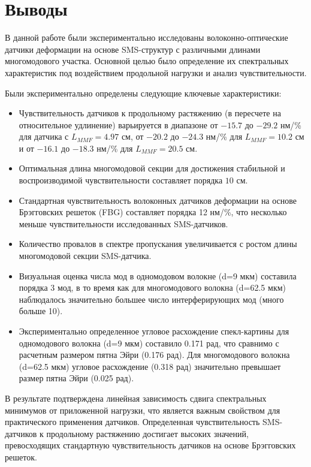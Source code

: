 \section{Выводы}

В данной работе были экспериментально исследованы волоконно-оптические датчики деформации на основе SMS-структур с различными длинами многомодового участка. Основной целью было определение их спектральных характеристик под воздействием продольной нагрузки и анализ чувствительности.

Были экспериментально определены следующие ключевые характеристики:

\begin{itemize}
    \item Чувствительность датчиков к продольному растяжению (в пересчете на относительное удлинение) варьируется в диапазоне от $-15.7$ до $-29.2$ нм/\% для датчика с $L_{MMF} = 4.97$ см, от $-20.2$ до $-24.3$ нм/\% для $L_{MMF} = 10.2$ см и от $-16.1$ до $-18.3$ нм/\% для $L_{MMF} = 20.5$ см.
    \item Оптимальная длина многомодовой секции для достижения стабильной и воспроизводимой чувствительности составляет порядка $10$ см.
    \item Стандартная чувствительность волоконных датчиков деформации на основе Брэгговских решеток (FBG) составляет порядка 12 нм/\%, что несколько меньше чувствительности исследованных SMS-датчиков.
    \item Количество провалов в спектре пропускания увеличивается с ростом длины многомодовой секции SMS-датчика.
    \item Визуальная оценка числа мод в одномодовом волокне (d=9 мкм) составила порядка 3 мод, в то время как для многомодового волокна (d=62.5 мкм) наблюдалось значительно большее число интерферирующих мод (много больше 10).
    \item Экспериментально определенное угловое расхождение спекл-картины для одномодового волокна (d=9 мкм) составило 0.171 рад, что сравнимо с расчетным размером пятна Эйри (0.176 рад). Для многомодового волокна (d=62.5 мкм) угловое расхождение (0.318 рад) значительно превышает размер пятна Эйри (0.025 рад).
\end{itemize}

В результате подтверждена линейная зависимость сдвига спектральных минимумов от приложенной нагрузки, что является важным свойством для практического применения датчиков. Определенная чувствительность SMS-датчиков к продольному растяжению достигает высоких значений, превосходящих стандартную чувствительность датчиков на основе Брэгговских решеток.

